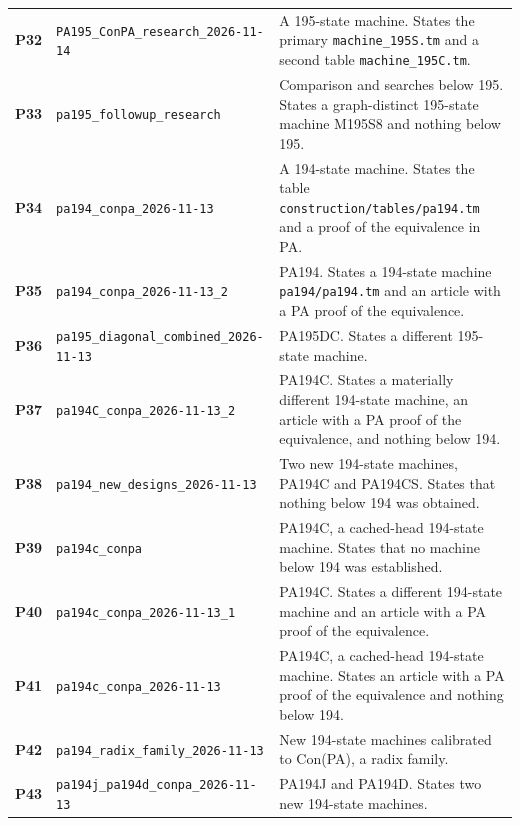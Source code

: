 \begin{longtable}{@{}>{\raggedright\arraybackslash}p{.055\linewidth}>{\raggedright\arraybackslash}p{.355\linewidth}>{\raggedright\arraybackslash}p{.55\linewidth}@{}}
\hypertarget{packet-P32}{\textbf{P32}} & \nolinkurl{PA195_ConPA_research_2026-11-14} & A 195-state machine. States the primary \nolinkurl{machine_195S.tm} and a second table \nolinkurl{machine_195C.tm}.\\[3pt]
\hypertarget{packet-P33}{\textbf{P33}} & \nolinkurl{pa195_followup_research} & Comparison and searches below 195. States a graph-distinct 195-state machine M195S8 and nothing below 195.\\[3pt]
\hypertarget{packet-P34}{\textbf{P34}} & \nolinkurl{pa194_conpa_2026-11-13} & A 194-state machine. States the table \nolinkurl{construction/tables/pa194.tm} and a proof of the equivalence in PA.\\[3pt]
\hypertarget{packet-P35}{\textbf{P35}} & \nolinkurl{pa194_conpa_2026-11-13_2} & PA194. States a 194-state machine \nolinkurl{pa194/pa194.tm} and an article with a PA proof of the equivalence.\\[3pt]
\hypertarget{packet-P36}{\textbf{P36}} & \nolinkurl{pa195_diagonal_combined_2026-11-13} & PA195DC. States a different 195-state machine.\\[3pt]
\hypertarget{packet-P37}{\textbf{P37}} & \nolinkurl{pa194C_conpa_2026-11-13_2} & PA194C. States a materially different 194-state machine, an article with a PA proof of the equivalence, and nothing below 194.\\[3pt]
\hypertarget{packet-P38}{\textbf{P38}} & \nolinkurl{pa194_new_designs_2026-11-13} & Two new 194-state machines, PA194C and PA194CS. States that nothing below 194 was obtained.\\[3pt]
\hypertarget{packet-P39}{\textbf{P39}} & \nolinkurl{pa194c_conpa} & PA194C, a cached-head 194-state machine. States that no machine below 194 was established.\\[3pt]
\hypertarget{packet-P40}{\textbf{P40}} & \nolinkurl{pa194c_conpa_2026-11-13_1} & PA194C. States a different 194-state machine and an article with a PA proof of the equivalence.\\[3pt]
\hypertarget{packet-P41}{\textbf{P41}} & \nolinkurl{pa194c_conpa_2026-11-13} & PA194C, a cached-head 194-state machine. States an article with a PA proof of the equivalence and nothing below 194.\\[3pt]
\hypertarget{packet-P42}{\textbf{P42}} & \nolinkurl{pa194_radix_family_2026-11-13} & New 194-state machines calibrated to Con(PA), a radix family.\\[3pt]
\hypertarget{packet-P43}{\textbf{P43}} & \nolinkurl{pa194j_pa194d_conpa_2026-11-13} & PA194J and PA194D. States two new 194-state machines.\\[3pt]

\end{longtable}
